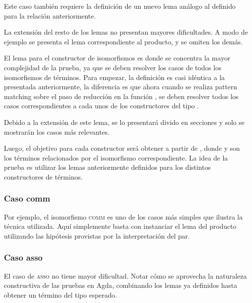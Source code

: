 Este caso también requiere la definición de un nuevo lema análogo al definido para la relación  anteriormente.


La extensión del resto de los lemas no presentan mayores dificultades.
A modo de ejemplo se presenta el lema correspondiente al producto, y se omiten los demás.


El lema para el constructor de isomorfismos es donde se concentra la mayor complejidad de la prueba, ya que se deben resolver los casos de todos los isomorfismos de términos.
Para empezar, la definición es casi idéntica a la presentada anteriormente, la diferencia es que ahora cuando se realiza pattern matching sobre el paso de reducción en la función , se deben resolver todos los casos correspondientes a cada unos de los constructores del tipo .

Debido a la extensión de este lema, se lo presentará divido en secciones y solo se mostrarán los casos más relevantes.


Luego, el objetivo para cada constructor será obtener \snstar{} a partir de \snstar{}, donde  y  son los términos relacionados por el isomorfismo correspondiente.
La idea de la prueba es utilizar los lemas anteriormente definidos para los distintos constructores de términos.

\subsubsection{Caso comm}

Por ejemplo, el isomorfismo \textsc{comm} es uno de los casos más simples que ilustra la técnica utilizada.
Aquí simplemente basta con instanciar el lema del producto utilizando las hipótesis provistas por la interpretación del par.


\subsubsection{Caso asso}

El caso de \textsc{asso} no tiene mayor dificultad.
Notar cómo se aprovecha la naturaleza constructiva de las pruebas en Agda, combinando los lemas ya definidos hasta obtener un término del tipo esperado.

